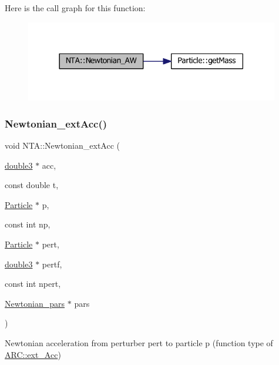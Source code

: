 Here is the call graph for this function\+:
\nopagebreak
\begin{figure}[H]
\begin{center}
\leavevmode
\includegraphics[width=314pt]{namespaceNTA_aad37ae368f0a920088e180a73187685a_cgraph}
\end{center}
\end{figure}
\hypertarget{namespaceNTA_a5b1a4fcaa09041cdf89a6b3122815c56}{}\label{namespaceNTA_a5b1a4fcaa09041cdf89a6b3122815c56} 
\subsubsection{\texorpdfstring{Newtonian\+\_\+ext\+Acc()}{Newtonian\_extAcc()}}
{\footnotesize\ttfamily void N\+T\+A\+::\+Newtonian\+\_\+ext\+Acc (\begin{DoxyParamCaption}\item[{\hyperlink{namespaceNTA_a19ccaac066849b26305dbbbee129fa0e}{double3} $\ast$}]{acc,  }\item[{const double}]{t,  }\item[{\hyperlink{classParticle}{Particle} $\ast$}]{p,  }\item[{const int}]{np,  }\item[{\hyperlink{classParticle}{Particle} $\ast$}]{pert,  }\item[{\hyperlink{namespaceNTA_a19ccaac066849b26305dbbbee129fa0e}{double3} $\ast$}]{pertf,  }\item[{const int}]{npert,  }\item[{\hyperlink{classNTA_1_1Newtonian__pars}{Newtonian\+\_\+pars} $\ast$}]{pars }\end{DoxyParamCaption})}



Newtonian acceleration from perturber pert to particle p (function type of \hyperlink{namespaceARC_aa423c7d6aff9481c040a20b3c5c6ff4e}{A\+R\+C\+::ext\+\_\+\+Acc}) 


